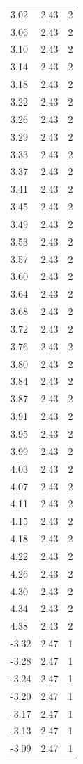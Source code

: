 \begin{longtable}{lrr}
  3.02 & 2.43 & 2 \\
  3.06 & 2.43 & 2 \\
  3.10 & 2.43 & 2 \\
  3.14 & 2.43 & 2 \\
  3.18 & 2.43 & 2 \\
  3.22 & 2.43 & 2 \\
  3.26 & 2.43 & 2 \\
  3.29 & 2.43 & 2 \\
  3.33 & 2.43 & 2 \\
  3.37 & 2.43 & 2 \\
  3.41 & 2.43 & 2 \\
  3.45 & 2.43 & 2 \\
  3.49 & 2.43 & 2 \\
  3.53 & 2.43 & 2 \\
  3.57 & 2.43 & 2 \\
  3.60 & 2.43 & 2 \\
  3.64 & 2.43 & 2 \\
  3.68 & 2.43 & 2 \\
  3.72 & 2.43 & 2 \\
  3.76 & 2.43 & 2 \\
  3.80 & 2.43 & 2 \\
  3.84 & 2.43 & 2 \\
  3.87 & 2.43 & 2 \\
  3.91 & 2.43 & 2 \\
  3.95 & 2.43 & 2 \\
  3.99 & 2.43 & 2 \\
  4.03 & 2.43 & 2 \\
  4.07 & 2.43 & 2 \\
  4.11 & 2.43 & 2 \\
  4.15 & 2.43 & 2 \\
  4.18 & 2.43 & 2 \\
  4.22 & 2.43 & 2 \\
  4.26 & 2.43 & 2 \\
  4.30 & 2.43 & 2 \\
  4.34 & 2.43 & 2 \\
  4.38 & 2.43 & 2 \\
  -3.32 & 2.47 & 1 \\
  -3.28 & 2.47 & 1 \\
  -3.24 & 2.47 & 1 \\
  -3.20 & 2.47 & 1 \\
  -3.17 & 2.47 & 1 \\
  -3.13 & 2.47 & 1 \\
  -3.09 & 2.47 & 1 \\

\end{longtable}
